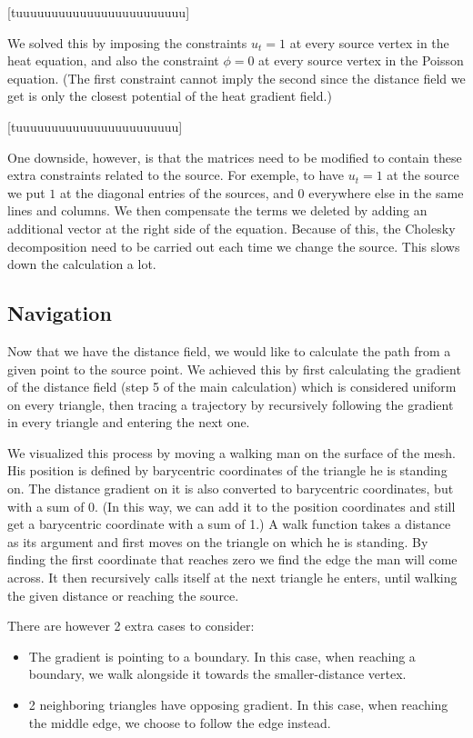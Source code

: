 \documentclass[a4paper,12pt,twoside]{article}
\begin{document}
[tuuuuuuuuuuuuuuuuuuuuuuuu]

We solved this by imposing the constraints $u_t = 1$ at every source vertex in the heat equation, and also the constraint $\phi = 0$ at every source vertex in the Poisson equation. (The first constraint cannot imply the second since the distance field we get is only the closest potential of the heat gradient field.)

[tuuuuuuuuuuuuuuuuuuuuuuu]

One downside, however, is that the matrices need to be modified to contain these extra constraints related to the source. For exemple, to have $u_t = 1$ at the source we put $1$ at the diagonal entries of the sources, and $0$ everywhere else in the same lines and columns. We then compensate the terms we deleted by adding an additional vector at the right side of the equation. Because of this, the Cholesky decomposition need to be carried out each time we change the source. This slows down the calculation a lot.

\subsection{Navigation}

Now that we have the distance field, we would like to calculate the path from a given point to the source point. We achieved this by first calculating the gradient of the distance field (step 5 of the main calculation) which is considered uniform on every triangle, then tracing a trajectory by recursively following the gradient in every triangle and entering the next one. 

We visualized this process by moving a walking man on the surface of the mesh. His position is defined by barycentric coordinates of the triangle he is standing on. The distance gradient on it is also converted to barycentric coordinates, but with a sum of 0. (In this way, we can add it to the position coordinates and still get a barycentric coordinate with a sum of 1.) A walk function takes a distance as its argument and first moves on the triangle on which he is standing. By finding the first coordinate that reaches zero we find the edge the man will come across. It then recursively calls itself at the next triangle he enters, until walking the given distance or reaching the source.

There are however 2 extra cases to consider:
\begin{itemize}
\item
The gradient is pointing to a boundary. In this case, when reaching a boundary, we walk alongside it towards the smaller-distance vertex.
\item
2 neighboring triangles have opposing gradient. In this case, when reaching the middle edge, we choose to follow the edge instead.
\end{itemize}
\end{document}
